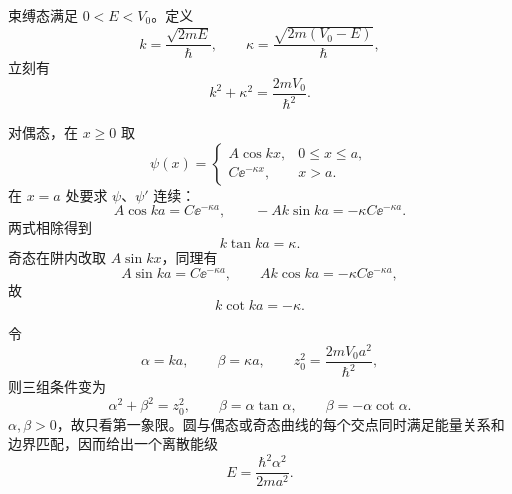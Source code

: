 \begin{checkedsolution}
束缚态满足 $0<E<V_0$。定义
\begin{equation}
  k=\frac{\sqrt{2mE}}{\hbar},
  \qquad
  \kappa=\frac{\sqrt{2m(V_0-E)}}{\hbar},
  \label{eq:QM-C05-S02-E06-k-kappa}
\end{equation}
立刻有
\begin{equation}
  k^2+\kappa^2=\frac{2mV_0}{\hbar^2}.
  \label{eq:QM-C05-S02-E06-circle-dimensional}
\end{equation}

对偶态，在 $x\geq0$ 取
\begin{equation}
  \psi(x)=
  \begin{cases}
    A\cos kx,&0\leq x\leq a,\\
    C\ee^{-\kappa x},&x>a.
  \end{cases}
  \label{eq:QM-C05-S02-E06-even-wavefunction}
\end{equation}
在 $x=a$ 处要求 $\psi$、$\psi'$ 连续：
\begin{equation}
  A\cos ka=C\ee^{-\kappa a},
  \qquad
  -Ak\sin ka=-\kappa C\ee^{-\kappa a}.
  \label{eq:QM-C05-S02-E06-even-boundary}
\end{equation}
两式相除得到
\begin{equation}
  \boxed{k\tan ka=\kappa}.
  \label{eq:QM-C05-S02-E06-even-condition}
\end{equation}
奇态在阱内改取 $A\sin kx$，同理有
\begin{equation}
  A\sin ka=C\ee^{-\kappa a},
  \qquad
  Ak\cos ka=-\kappa C\ee^{-\kappa a},
  \label{eq:QM-C05-S02-E06-odd-boundary}
\end{equation}
故
\begin{equation}
  \boxed{k\cot ka=-\kappa}.
  \label{eq:QM-C05-S02-E06-odd-condition}
\end{equation}

令
\begin{equation}
  \alpha=ka,
  \qquad
  \beta=\kappa a,
  \qquad
  z_0^2=\frac{2mV_0a^2}{\hbar^2},
  \label{eq:QM-C05-S02-E06-dimensionless}
\end{equation}
则三组条件变为
\begin{equation}
  \alpha^2+\beta^2=z_0^2,
  \qquad
  \beta=\alpha\tan\alpha,
  \qquad
  \beta=-\alpha\cot\alpha.
  \label{eq:QM-C05-S02-E06-graph-equations}
\end{equation}
$\alpha,\beta>0$，故只看第一象限。圆与偶态或奇态曲线的每个交点同时满足能量关系和边界匹配，因而给出一个离散能级
\begin{equation}
  E=\frac{\hbar^2\alpha^2}{2ma^2}.
  \label{eq:QM-C05-S02-E06-energy-alpha}
\end{equation}


\end{checkedsolution}
